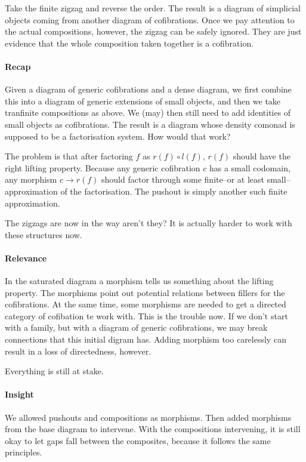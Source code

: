 \documentclass[csh.tex]{subfiles}
\begin{document}
Take the finite zigzag and reverse the order. The result is a diagram of simplicial objects coming from another diagram of cofibrations. Once we pay attention to the actual compositions, however, the zigzag can be safely ignored. They are just evidence that the whole composition taken together is a cofibration.

\paragraph{Recap}
Given a diagram of generic cofibrations and a dense diagram, we first combine this into a diagram of generic extensions of small objects, and then we take tranfinite compositions as above. We (may) then still need to add identities of small objects as cofibrations. The result is a diagram whose density comonad is supposed to be a factorisation system. How would that work?

The problem is that after factoring $f$ as $r(f)\circ l(f)$, $r(f)$ should have the right lifting property. Because any generic cofibration $c$ has a small codomain, any morphism $c\to r(f)$ should factor through some finite--or at least small--approximation of the factorisation. The pushout is simply another such finite approximation.

The zigzags are now in the way aren't they? It is actually harder to work with these structures now.

\paragraph{Relevance}
In the saturated diagram a morphism tells us something about the lifting property. The morphisms point out potential relations between fillers for the cofibrations. At the same time, some morphisms are needed to get a directed category of cofibation te work with. This is the trouble now. If we don't start with a family, but with a diagram of generic cofibrations, we may break connections that this initial digram has. Adding morphism too carelessly can result in a loss of directedness, however.

Everything is still at stake.

\paragraph{Insight}
We allowed pushouts and compositions as morphisms. Then added morphisms from the base diagram to intervene. With the compositions intervening, it is still okay to let gaps fall between the composites, because it follows the same principles.
\end{document}
